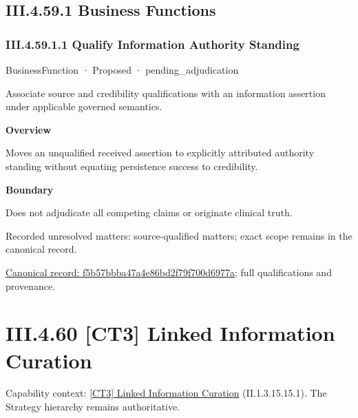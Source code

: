 \subsection*{III.4.59.1 Business Functions}
\label{navigation:III.4.59.1}

\subsubsection*{III.4.59.1.1 Qualify Information Authority Standing}
\label{navigation:III.4.59.1.1}

\label{element:f5b57bbba47a4e86bd2f79f700d6977a}
{\small BusinessFunction · Proposed · pending\_adjudication}\par

Associate source and credibility qualifications with an information assertion under applicable governed semantics.



\textbf{Overview}



Moves an unqualified received assertion to explicitly attributed authority standing without equating persistence success to credibility.



\textbf{Boundary}



Does not adjudicate all competing claims or originate clinical truth.


{\small Recorded unresolved matters: source-qualified matters; exact scope remains in the canonical record.}\par
{\footnotesize \href{../../../../continuum/business/business-function/f5b57bbba47a4e86bd2f79f700d6977a.md}{Canonical record: f5b57bbba47a4e86bd2f79f700d6977a}; full qualifications and provenance.}\par
\section*{III.4.60 [CT3] Linked Information Curation}
\label{navigation:III.4.60}

{\small Capability context: \hyperref[element:5edb2a8b5ee54ddda8104d1fab323a94]{[CT3] Linked Information Curation} (II.1.3.15.15.1). The Strategy hierarchy remains authoritative.}\par
